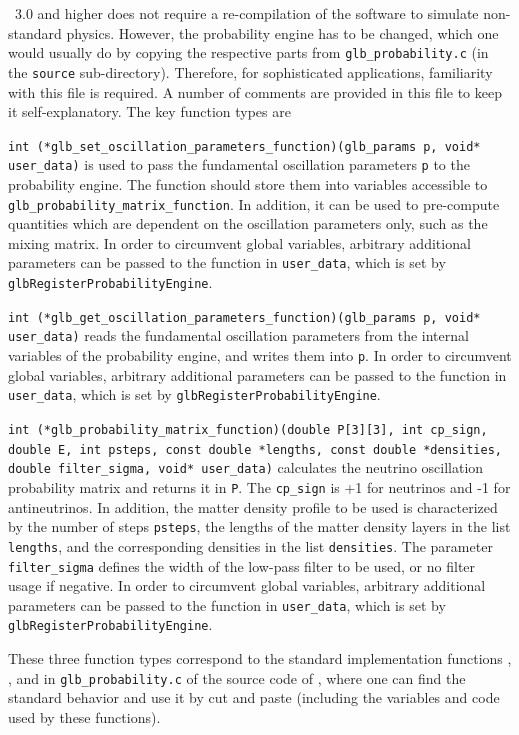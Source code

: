 \GLOBES\ 3.0 and higher does not require a re-compilation of the software to simulate non-standard physics.
However, the probability engine has to be changed, which one would usually do by copying the respective parts from {\tt glb\_probability.c} (in the {\tt source} sub-directory). Therefore, for sophisticated applications, familiarity with this file is required. A number of comments are provided in this file to keep it self-explanatory.
The key function types are
\begin{function}
{\tt int (*glb\_set\_oscillation\_parameters\_function)(glb\_params p, void* user\_data)} is
used to pass the fundamental oscillation parameters {\tt p} to the probability engine.
The function should store them into variables accessible to {\tt glb\_probability\_matrix\_function}.
In addition, it can be used to pre-compute quantities which are dependent on the oscillation parameters only, such
as the mixing matrix. 
In order to circumvent global variables, arbitrary additional parameters can be
passed to the function in {\tt user\_data}, which is set by {\tt glbRegisterProbabilityEngine}.
\end{function}
\begin{function}
{\tt int (*glb\_get\_oscillation\_parameters\_function)(glb\_params p, void* user\_data)}
reads the fundamental oscillation parameters from the internal variables of the probability
engine, and writes them into {\tt p}.
In order to circumvent global variables, arbitrary additional parameters can be
passed to the function in {\tt user\_data}, which is set by {\tt glbRegisterProbabilityEngine}.
\end{function}
\begin{function}
{\tt int (*glb\_probability\_matrix\_function)(double P[3][3], int cp\_sign, double E,
                  int psteps, const double *lengths, const double *densities,
                  double filter\_sigma, void* user\_data)}
calculates the neutrino oscillation probability matrix and returns it in {\tt P}.
The {\tt cp\_sign} is +1 for neutrinos and -1 for antineutrinos. In addition, the matter
density profile to be used is characterized by the number of steps {\tt psteps}, the
lengths of the matter density layers in the list {\tt lengths}, and the corresponding
densities in the list {\tt densities}. The parameter {\tt filter\_sigma} defines
the width of the low-pass filter to be used, or no filter usage if negative.
In order to circumvent global variables, arbitrary additional parameters can be
passed to the function in {\tt user\_data}, which is set by {\tt glbRegisterProbabilityEngine}.
\end{function}
These three function types correspond to the standard implementation functions , , and  in {\tt glb\_probability.c} of the source code of \GLOBES , where one can find the standard behavior and use it by cut and paste (including the variables and code used by these functions).

